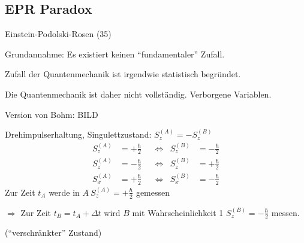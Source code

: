 \subsection{EPR Paradox}
	Einstein-Podolski-Rosen (35)
	
	Grundannahme: Es existiert keinen ``fundamentaler'' Zufall.
	
	Zufall der Quantenmechanik ist irgendwie statistisch begründet.
	
	Die Quantenmechanik ist daher nicht vollständig. Verborgene Variablen.
	
	Version von Bohm: BILD

	Drehimpulserhaltung, Singulettzustand: $S_z^{(A)} = -S_z^{(B)}$
		\begin{align*} 
			S_{z}^{(A)} &= + \frac{\hbar}{2} &
			&\Leftrightarrow &S_z^{(B)} &= -\frac{\hbar}{2} \\
			S_z^{(A)} &= -\frac{\hbar}{2}& &\Leftrightarrow &S_z^{(B)} &= + \frac{\hbar}{2} \\
			S_x^{(A)} &= + \frac{\hbar}{2}& &\Leftrightarrow &S_x^{(B)} &= - \frac{\hbar}{2} 
		\end{align*}
	Zur Zeit $t_A$ werde in $A ~ S_z^{(A)} = + \frac{\hbar}{2}$ gemessen
	
	$\Rightarrow$ Zur Zeit $t_B = t_A + \Delta t$ wird $B$ mit Wahrscheinlichkeit 1 $S_z^{(B)} = -\frac{\hbar}{2}$ messen.
	
	(``verschränkter'' Zustand)
